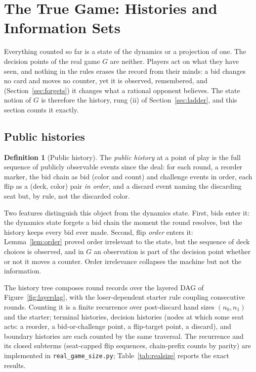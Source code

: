 \documentclass[11pt]{article}
\theoremstyle{plain}
\theoremstyle{definition}
\newtheorem{definition}[theorem]{Definition}
\theoremstyle{remark}
\newcommand{\code}[1]{\texttt{\small #1}}
\begin{document}
\section{The True Game: Histories and Information Sets}\label{sec:realsize}

Everything counted so far is a state of the dynamics or a projection of
one. The decision points of the real game $G$ are neither. Players act on
what they have seen, and nothing in the rules erases the record from their
minds: a bid changes no card and moves no counter, yet it is observed,
remembered, and (Section~\ref{sec:forgets}) it changes what a rational
opponent believes. The state notion of $G$ is therefore the history, rung
(ii) of Section~\ref{sec:ladder}, and this section counts it exactly.

\subsection{Public histories}

\begin{definition}[Public history]\label{def:pubhist}
The \emph{public history} at a point of play is the full sequence of
publicly observable events since the deal: for each round, a reorder marker,
the bid chain as bid (color and count) and challenge events in order, each
flip as a (deck, color) pair \emph{in order}, and a discard event naming the
discarding seat but, by rule, not the discarded color.
\end{definition}

Two features distinguish this object from the dynamics state. First, bids
enter it: the dynamics state forgets a bid chain the moment the round
resolves, but the history keeps every bid ever made. Second, flip
\emph{order} enters it: Lemma~\ref{lem:order} proved order irrelevant to
the state, but the sequence of deck choices is observed, and in $G$ an
observation is part of the decision point whether or not it moves a
counter. Order irrelevance collapses the machine but not the information.

The history tree composes round records over the layered DAG of
Figure~\ref{fig:layerdag}, with the loser-dependent starter rule coupling
consecutive rounds. Counting it is a finite recurrence over post-discard
hand sizes $(n_0,n_1)$ and the starter; terminal histories, decision
histories (nodes at which some seat acts: a reorder, a bid-or-challenge
point, a flip-target point, a discard), and boundary histories are each
counted by the same traversal. The recurrence and its closed subterms
(seat-capped flip sequences, chain-prefix counts by parity) are implemented
in \code{real\_game\_size.py}; Table~\ref{tab:realsize} reports the exact
results.
\end{document}
